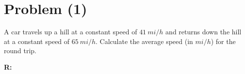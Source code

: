 \section{Problem (1)}
	A car travels up a hill at a constant speed of $41 \ mi/h$ and returns down the hill at a constant speed of $65 \ mi/h$. Calculate the average speed (in $mi/h$) for the round trip.

	\textbf{R:} \newline
